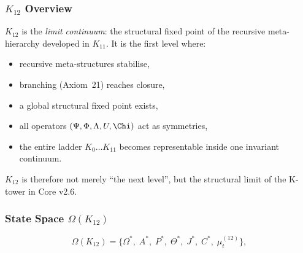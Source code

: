 

\subsubsection{$K_{12}$ Overview}
\label{sec:k12-overview}

$K_{12}$ is the \emph{limit continuum}: the structural fixed point of the
recursive meta-hierarchy developed in $K_{11}$.  
It is the first level where:

\begin{itemize}
    \item recursive meta-structures stabilise,
    \item branching (Axiom~21) reaches closure,
    \item a global structural fixed point exists,
    \item all operators $(\Psi,\Phi,\Lambda,U,\Chi)$ act as symmetries,
    \item the entire ladder $K_0\dots K_{11}$ becomes representable inside one
          invariant continuum.
\end{itemize}

$K_{12}$ is therefore not merely “the next level”, but the structural limit of
the K-tower in Core v2.6.

\subsubsection{State Space $\Omega(K_{12})$}

\[
\Omega(K_{12}) =
\{
\Omega^*,\;
A^*,\;
P^*,\;
\Theta^*,\;
J^*,\;
C^*,\;
\mu^{(12)}_t
\},
\]

